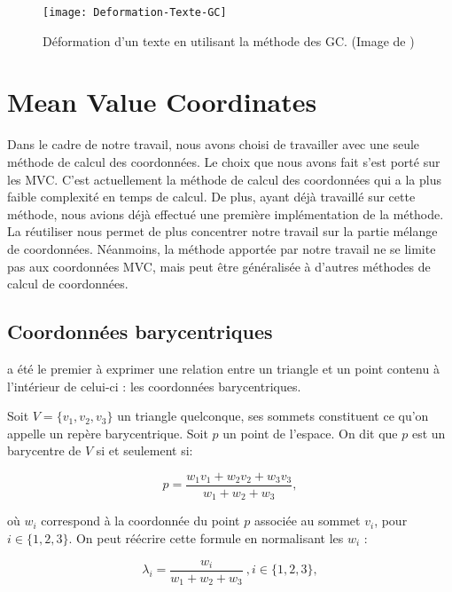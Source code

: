 \begin{figure}[!ht]
\texttt{[image: Deformation-Texte-GC]}

\caption[Déformation d'un texte (GC)] {Déformation d'un texte en utilisant la
méthode des GC. (Image de \cite{LLC08})}

\label{DEFGre}
\end{figure}

\section{Mean Value Coordinates}

Dans le cadre de notre travail, nous avons choisi de travailler avec une seule
méthode de calcul des coordonnées. Le choix que nous avons fait s'est porté
sur les MVC. C'est actuellement la méthode de calcul des coordonnées qui a la
plus faible complexité en temps de calcul. De plus, ayant déjà travaillé sur
cette méthode, nous avions déjà effectué une première implémentation de la
méthode. La réutiliser nous permet de plus concentrer notre travail sur la
partie mélange de coordonnées. Néanmoins, la méthode apportée par notre
travail ne se limite pas aux coordonnées MVC, mais peut être généralisée à
d'autres méthodes de calcul de coordonnées.

\subsection{Coordonnées barycentriques}

\cite{Mob27} a été le premier à exprimer une relation entre un triangle et un
point contenu à l'intérieur de celui-ci : les coordonnées barycentriques.

Soit $V = \{v_1, v_2, v_3\}$ un triangle quelconque, ses sommets constituent ce
qu'on appelle un repère barycentrique. Soit $p$ un point de l'espace. On dit
que $p$ est un barycentre de $V$ si et seulement si:

\begin{equation}
  p = \frac{w_1 v_1 + w_2 v_2 + w_3 v_3}{w_1+w_2+w_3},
  \label{DEFPos}
\end{equation}

où $w_i$ correspond à la coordonnée du point $p$ associée au sommet $v_i$,
pour $i \in \{1, 2, 3\}$. On peut réécrire cette formule en normalisant les
$w_i$ :

\begin{equation}
  \lambda_i = \frac{w_i}{w_1+w_2+w_3} ~, i \in \{1, 2, 3\}, 
\end{equation}

